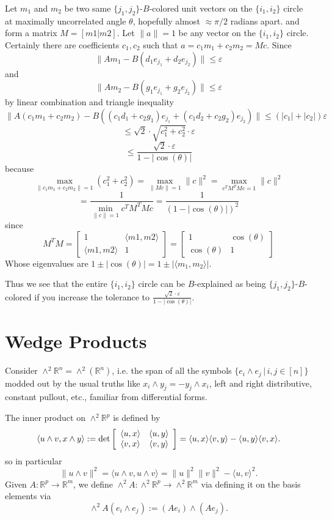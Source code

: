 \documentclass[11pt]{amsart}
\newcommand{\R}{\mathbb{R}}
\begin{document}
Let $m_1$ and $m_2$ be two same $\{j_1,j_2\}$-$B$-colored unit vectors on the $\{i_1,i_2\}$ circle at maximally uncorrelated 
angle $\theta$, 
hopefully almost $\approx \pi/2$  radians apart. 
and form a matrix $M=[m1|m2]$.  Let $\|a\|=1$ be any vector on the $\{i_1,i_2\}$ circle.  Certainly there are coefficients $c_1, c_2$
such that $a=c_1 m_1 +c_2 m_2 =Mc$.  Since 
\[\|Am_1-B(d_1 e_{j_1}+d_2e_{j_2})\|\leq \varepsilon \] and 
\[\|Am_2-B(g_1 e_{j_1}+g_2e_{j_2})\|\leq \varepsilon \]
by linear combination and triangle inequality
\[\|A(c_1m_1+c_2m_2)-B((c_1d_1+c_2g_1 )e_{j_1}+(c_1d_2+c_2g_2)e_{j_2})\|\leq (|c_1|+|c_2|)\varepsilon \]
\[\leq \sqrt{2}\cdot \sqrt{c_1^2+c_2^2} \cdot \varepsilon \]
\[\leq \frac{\sqrt{2} \cdot \varepsilon}{1-|\cos(\theta)|} \]
because 
\[\underset{\|c_1 m_1 +c_2 m_2\|=1}{\max} \left(c_1^2+c_2^2\right)=\underset{\|Mc\|=1}{\max} \|c\|^2=\underset{c^TM^TMc=1}{\max} \|c\|^2\]
\[=\frac{1}{\underset{ \|c\|=1}{\min} c^TM^TMc}=\frac{1}{(1-|\cos(\theta)|)^2}\]
since \[M^TM=\left[\begin{array}{cc}1 & \langle m1, m2 \rangle \\ \langle m1 , m2 \rangle & 1 \end{array}\right]
=\left[\begin{array}{cc}1 & \cos(\theta) \\ \cos(\theta) & 1 \end{array}\right]\]
Whose eigenvalues are $1\pm |\cos(\theta)|=1\pm |\langle m_1, m_2 \rangle|$.

Thus we see that the entire $\{i_1,i_2\}$ circle can be $B$-explained as being  $\{j_1,j_2\}$-$B$-colored if you increase the 
tolerance to $\frac{\sqrt{2} \cdot \varepsilon}{1-|\cos(\theta)|}$.
\section{Wedge Products}
Consider $\wedge^2 \R^n=\wedge^2 (\R^n)$, i.e. the span of all the symbols $\{e_i\wedge e_j\,|\, i,j\in [n]\}$ modded out by the 
usual truths like $x_i\wedge y_j=-y_j\wedge x_i$, left and right distributive, constant pullout, etc., familiar from differential forms.

The inner product on $\wedge^2 \R^p$ is defined by 
\begin{equation}
\langle u\wedge v, x \wedge y \rangle:=\det \left[ \begin{array}{c c} 
 \langle u,x \rangle &  \langle u,y \rangle \\ 
 \langle v,x \rangle & \langle v,y \rangle \\ 
 \end{array} \right]
 = \langle u,x \rangle  \langle v,y \rangle -   \langle u,y \rangle  \langle v,x \rangle.
\end{equation}
so in particular
\begin{equation}
\|u\wedge v\|^2=
\langle u\wedge v, u \wedge v \rangle 
= \|u\|^2  \|v\|^2 -   \langle u,v \rangle^2.
\end{equation}
Given $A:\R^p\rightarrow \R^m$, we define $\wedge^2 A: \wedge^2 \R^p \rightarrow \wedge^2 \R^m$ via defining it on the basis 
elements via
\[\wedge^2 A(e_i\wedge e_j) :=(Ae_i) \wedge (Ae_j). \]
\end{document}
